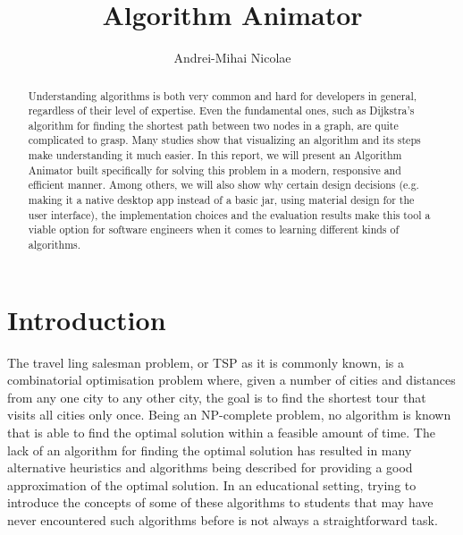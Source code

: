 \documentclass{l4proj}
\begin{document}
\title{Algorithm Animator}
\author{Andrei-Mihai Nicolae}
\maketitle

\begin{abstract}
Understanding algorithms is both very common and hard for developers in general,
regardless of their level of expertise. Even the fundamental ones, such as Dijkstra's algorithm
for finding the shortest path between two nodes in a graph, are quite complicated to grasp. Many 
studies show that visualizing an algorithm and its steps make understanding it much easier. In
this report, we will present an Algorithm Animator built specifically for solving this problem 
in a modern, responsive and efficient manner. Among others, we will also show why certain design decisions (e.g. making it a native
desktop app instead of a basic jar, using material design for the user interface), the implementation choices and the
evaluation results make this tool a viable option for software engineers when it comes to learning different kinds of 
algorithms.
\end{abstract}

\educationalconsent

\tableofcontents
\chapter{Introduction}
\label{intro}
The travel ling salesman problem, or TSP as it is commonly known, is a combinatorial optimisation problem where, given a number of cities and 
distances from any one city to any other city, the goal is to find the shortest tour that visits all cities only once. Being an NP-complete 
problem, no algorithm is known that is able to find the optimal solution within a feasible amount of time. The lack of an algorithm for finding 
the optimal solution has resulted in many alternative heuristics and algorithms being described for providing a good approximation of the optimal 
solution. In an educational setting, trying to introduce the concepts of some of these algorithms to students that may have never encountered 
such algorithms before is not always a straightforward task.
\end{document}
